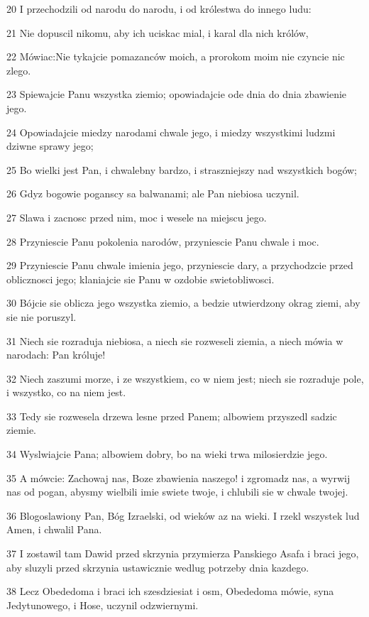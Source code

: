 \par 20 I przechodzili od narodu do narodu, i od królestwa do innego ludu:
\par 21 Nie dopuscil nikomu, aby ich uciskac mial, i karal dla nich królów,
\par 22 Mówiac:Nie tykajcie pomazanców moich, a prorokom moim nie czyncie nic zlego.
\par 23 Spiewajcie Panu wszystka ziemio; opowiadajcie ode dnia do dnia zbawienie jego.
\par 24 Opowiadajcie miedzy narodami chwale jego, i miedzy wszystkimi ludzmi dziwne sprawy jego;
\par 25 Bo wielki jest Pan, i chwalebny bardzo, i straszniejszy nad wszystkich bogów;
\par 26 Gdyz bogowie poganscy sa balwanami; ale Pan niebiosa uczynil.
\par 27 Slawa i zacnosc przed nim, moc i wesele na miejscu jego.
\par 28 Przyniescie Panu pokolenia narodów, przyniescie Panu chwale i moc.
\par 29 Przyniescie Panu chwale imienia jego, przyniescie dary, a przychodzcie przed oblicznosci jego; klaniajcie sie Panu w ozdobie swietobliwosci.
\par 30 Bójcie sie oblicza jego wszystka ziemio, a bedzie utwierdzony okrag ziemi, aby sie nie poruszyl.
\par 31 Niech sie rozraduja niebiosa, a niech sie rozweseli ziemia, a niech mówia w narodach: Pan króluje!
\par 32 Niech zaszumi morze, i ze wszystkiem, co w niem jest; niech sie rozraduje pole, i wszystko, co na niem jest.
\par 33 Tedy sie rozwesela drzewa lesne przed Panem; albowiem przyszedl sadzic ziemie.
\par 34 Wyslwiajcie Pana; albowiem dobry, bo na wieki trwa milosierdzie jego.
\par 35 A mówcie: Zachowaj nas, Boze zbawienia naszego! i zgromadz nas, a wyrwij nas od pogan, abysmy wielbili imie swiete twoje, i chlubili sie w chwale twojej.
\par 36 Blogoslawiony Pan, Bóg Izraelski, od wieków az na wieki. I rzekl wszystek lud Amen, i chwalil Pana.
\par 37 I zostawil tam Dawid przed skrzynia przymierza Panskiego Asafa i braci jego, aby sluzyli przed skrzynia ustawicznie wedlug potrzeby dnia kazdego.
\par 38 Lecz Obededoma i braci ich szesdziesiat i osm, Obededoma mówie, syna Jedytunowego, i Hose, uczynil odzwiernymi.
